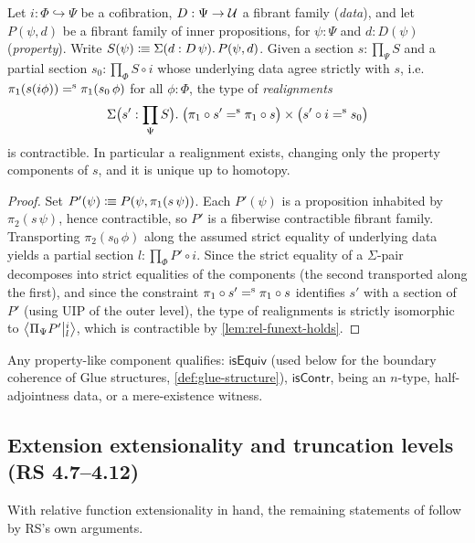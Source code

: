 \begin{corollary}\label{cor:prop-realign}
	Let $i:\Phi\hookrightarrow\Psi$ be a cofibration, $D:\Psi\to\UU$ a
	fibrant family (\emph{data}), and let $P(\psi,d)$ be a fibrant family of
	inner propositions, for $\psi:\Psi$ and $d:D(\psi)$ (\emph{property}).
	Write $S(\psi)\colonequiv\Sigma(d:D\,\psi).\,P(\psi,d)$. Given a section
	$s:\prod_\Psi S$ and a partial section $s_0:\prod_\Phi S\circ i$ whose
	underlying data agree strictly with $s$, i.e.\
	$\pi_1(s(i\phi))\seq\pi_1(s_0\,\phi)$ for all $\phi:\Phi$, the type of
	\emph{realignments}
	\[
		\Sigma\bigl(s':\prod_\Psi S\bigr).\;
		\bigl(\pi_1\circ s'\seq\pi_1\circ s\bigr)\times
		\bigl(s'\circ i\seq s_0\bigr)
	\]
	is contractible. In particular a realignment exists, changing only the
	property components of $s$, and it is unique up to homotopy.
\end{corollary}
\begin{proof}
	Set $P'(\psi)\colonequiv P(\psi,\pi_1(s\,\psi))$. Each $P'(\psi)$ is a
	proposition inhabited by $\pi_2(s\,\psi)$, hence contractible, so $P'$ is
	a fiberwise contractible fibrant family. Transporting $\pi_2(s_0\,\phi)$
	along the assumed strict equality of underlying data yields a partial
	section $l:\prod_\Phi P'\circ i$. Since the strict equality of a
	$\Sigma$-pair decomposes into strict equalities of the components (the
	second transported along the first), and since the constraint
	$\pi_1\circ s'\seq\pi_1\circ s$ identifies $s'$ with a section of $P'$
	(using UIP of the outer level), the type of realignments is strictly
	isomorphic to $\Ext{i}{\Pi_\Psi P'}{l}$, which is contractible by
	\cref{lem:rel-funext-holds}.
\end{proof}

\noindent
Any property-like component qualifies: $\mathsf{isEquiv}$ (used below for
the boundary coherence of Glue structures, \cref{def:glue-structure}),
$\mathsf{isContr}$, being an $n$-type, half-adjointness data, or a
mere-existence witness.

\subsection{Extension extensionality and truncation levels (RS 4.7--4.12)}

With relative function extensionality in hand, the remaining statements of
\citet[\S4]{RS2017} follow by RS's own arguments.

